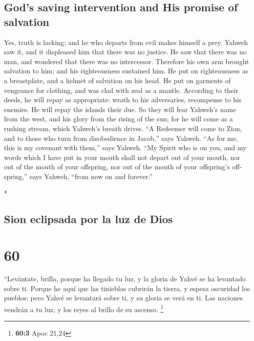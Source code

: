 \begin{paracol}{2}
\begin{otherlanguage}{english}
\hypertarget{gods-saving-intervention-and-his-promise-of-salvation}{%
\subsection{God's saving intervention and His promise of
salvation}\label{gods-saving-intervention-and-his-promise-of-salvation}}

 Yes, truth is lacking; and he who departs from evil
makes himself a prey. Yahweh saw it, and it displeased him that there
was no justice.  He saw that there was no man, and
wondered that there was no intercessor. Therefore his own arm brought
salvation to him; and his righteousness sustained him. 
He put on righteousness as a breastplate, and a helmet of salvation on
his head. He put on garments of vengeance for clothing, and was clad
with zeal as a mantle.  According to their deeds, he will
repay as appropriate: wrath to his adversaries, recompense to his
enemies. He will repay the islands their due.  So they
will fear Yahweh's name from the west, and his glory from the rising of
the sun; for he will come as a rushing stream, which Yahweh's breath
drives.  ``A Redeemer will come to Zion, and to those who
turn from disobedience in Jacob,'' says Yahweh.  ``As for
me, this is my covenant with them,'' says Yahweh. ``My Spirit who is on
you, and my words which I have put in your mouth shall not depart out of
your mouth, nor out of the mouth of your offspring, nor out of the mouth
of your offspring's offspring,'' says Yahweh, ``from now on and
forever.''

\end{otherlanguage}

\switchcolumn[0]*

\hypertarget{sion-eclipsada-por-la-luz-de-dios}{%
\subsection{Sion eclipsada por la luz de
Dios}\label{sion-eclipsada-por-la-luz-de-dios}}

\hypertarget{section-118}{%
\section{60}\label{section-118}}

 ``Levántate, brilla, porque ha llegado tu luz, y la
gloria de Yahvé se ha levantado sobre ti.  Porque he aquí
que las tinieblas cubrirán la tierra, y espesa oscuridad los pueblos;
pero Yahvé se levantará sobre ti, y su gloria se verá en ti.
 Las naciones vendrán a tu luz, y los reyes al brillo de
su ascenso. \footnote{\textbf{60:3} Apoc 21,24}


\end{paracol}
